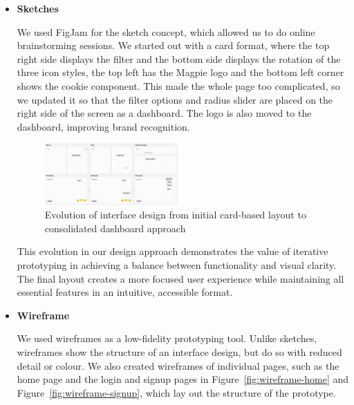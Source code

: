 \begin{itemize}
\item \textbf{Sketches}

We used FigJam for the sketch concept, which allowed us to do online brainstorming 
sessions. We started out with a card format, where the top right side displays
the filter and the bottom side displays the rotation of the three icon styles, 
the top left has the Magpie logo and the bottom left corner shows the cookie
component. This made the whole page too complicated, so we updated it so that 
the filter options and radius slider are placed on the right side of the screen
as a dashboard. The logo is also moved to the dashboard, improving brand 
recognition.

\begin{figure}[htbp]
    \centering
    \includegraphics[width=0.48\textwidth]{images/sketch.jpg}
    \caption{Evolution of interface design from initial card-based layout to consolidated dashboard approach}
    \label{fig:prototype-evolution}
\end{figure}

This evolution in our design approach demonstrates the value of iterative
prototyping in achieving a balance between functionality and visual clarity. The
final layout creates a more focused user experience while maintaining all
essential features in an intuitive, accessible format.

\item \textbf{Wireframe}

We used wireframes as a low-fidelity prototyping tool. Unlike sketches, wireframes 
show the structure of an interface design, but do so with reduced detail or colour. 
We also created wireframes of individual pages, such as the home page and the 
login and signup pages in Figure~\ref{fig:wireframe-home} and Figure~\ref{fig:wireframe-signup},
which lay out the structure of the prototype.
\end{itemize}

